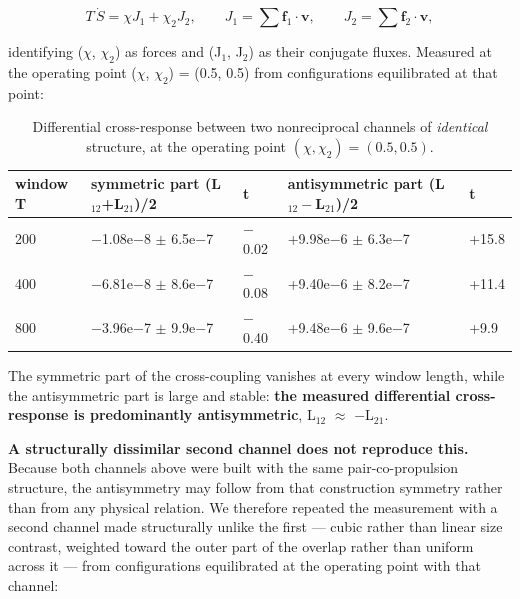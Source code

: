 \documentclass[aps,pre,preprint,superscriptaddress,nofootinbib,longbibliography]{revtex4-2}
\begin{document}
\begin{equation}
T\,\dot S=\chi J_1+\chi_2 J_2,\qquad J_1=\sum \mathbf{f}_1\!\cdot\!\mathbf{v},\qquad J_2=\sum \mathbf{f}_2\!\cdot\!\mathbf{v},
\end{equation}

identifying ($\chi$, $\chi _{2}$) as forces and (J$_{1}$, J$_{2}$) as their conjugate fluxes. Measured at the operating point ($\chi$, $\chi _{2}$) = (0.5, 0.5) from configurations equilibrated at that point:

\begin{table}[htbp]
\caption{Differential cross-response between two nonreciprocal channels of \emph{identical} structure, at the operating point $(\chi,\chi_2)=(0.5,0.5)$.}
\label{tab:14}
\begin{ruledtabular}
\begin{tabular}{p{1.88cm}p{3.98cm}p{1.76cm}p{4.25cm}p{1.48cm}}
\raggedright
window T & symmetric part (L$_{12}$+L$_{21}$)/2 & t & antisymmetric part (L$_{12} -$L$_{21}$)/2 & t \\
\hline
200 & $-$1.08e$-$8 $\pm$ 6.5e$-$7 & $-$0.02 & +9.98e$-$6 $\pm$ 6.3e$-$7 & +15.8 \\
400 & $-$6.81e$-$8 $\pm$ 8.6e$-$7 & $-$0.08 & +9.40e$-$6 $\pm$ 8.2e$-$7 & +11.4 \\
800 & $-$3.96e$-$7 $\pm$ 9.9e$-$7 & $-$0.40 & +9.48e$-$6 $\pm$ 9.6e$-$7 & +9.9 \\
\end{tabular}
\end{ruledtabular}
\end{table}

The symmetric part of the cross-coupling vanishes at every window length, while the antisymmetric part is large and stable: \textbf{the measured differential cross-response is predominantly antisymmetric}, L$_{12}$ $\approx$ $-$L$_{21}$.

\textbf{A structurally dissimilar second channel does not reproduce this.} Because both channels above were built with the same pair-co-propulsion structure, the antisymmetry may follow from that construction symmetry rather than from any physical relation. We therefore repeated the measurement with a second channel made structurally unlike the first --- cubic rather than linear size contrast, weighted toward the outer part of the overlap rather than uniform across it --- from configurations equilibrated at the operating point with that channel:
\end{document}
